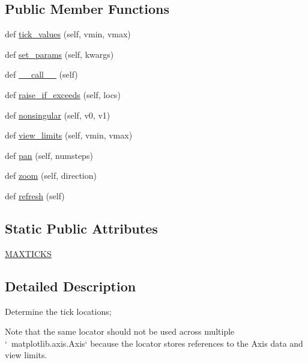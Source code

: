 \subsection*{Public Member Functions}
\begin{DoxyCompactItemize}
\item 
def \hyperlink{classmatplotlib_1_1ticker_1_1Locator_aa7ec417a277dde9f3892a7b951be2194}{tick\+\_\+values} (self, vmin, vmax)
\item 
def \hyperlink{classmatplotlib_1_1ticker_1_1Locator_a25c3ebd1700f852dbc23f8d9c3962bf8}{set\+\_\+params} (self, kwargs)
\item 
def \hyperlink{classmatplotlib_1_1ticker_1_1Locator_aeeb34f8825a0fd1b41e5e564e4224299}{\+\_\+\+\_\+call\+\_\+\+\_\+} (self)
\item 
def \hyperlink{classmatplotlib_1_1ticker_1_1Locator_a0988fbd430958f81cef4cf2a1ee2e823}{raise\+\_\+if\+\_\+exceeds} (self, locs)
\item 
def \hyperlink{classmatplotlib_1_1ticker_1_1Locator_a6cca034433594fb57f3a6caeb2851577}{nonsingular} (self, v0, v1)
\item 
def \hyperlink{classmatplotlib_1_1ticker_1_1Locator_a91e8853577056222536f93adf1b397f9}{view\+\_\+limits} (self, vmin, vmax)
\item 
def \hyperlink{classmatplotlib_1_1ticker_1_1Locator_a14627487661009bda79b81ab1a453ad2}{pan} (self, numsteps)
\item 
def \hyperlink{classmatplotlib_1_1ticker_1_1Locator_ac647739f81ccbff8c008cd024ff1ce3f}{zoom} (self, direction)
\item 
def \hyperlink{classmatplotlib_1_1ticker_1_1Locator_a6eb9f0e5e37cb3a796ffd6fadec5edca}{refresh} (self)
\end{DoxyCompactItemize}
\subsection*{Static Public Attributes}
\begin{DoxyCompactItemize}
\item 
\hyperlink{classmatplotlib_1_1ticker_1_1Locator_aabe4575c4dfa27e5debfddec71b80fcc}{M\+A\+X\+T\+I\+C\+KS}
\end{DoxyCompactItemize}


\subsection{Detailed Description}
\begin{DoxyVerb}Determine the tick locations;

Note that the same locator should not be used across multiple
`~matplotlib.axis.Axis` because the locator stores references to the Axis
data and view limits.
\end{DoxyVerb}
 

